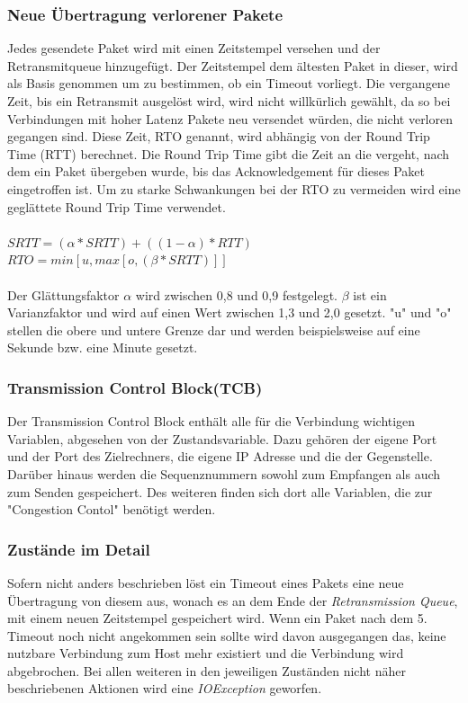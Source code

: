 \subsubsection{Neue Übertragung verlorener Pakete}
Jedes gesendete Paket wird mit einen Zeitstempel versehen und der Retransmitqueue hinzugefügt. Der Zeitstempel dem ältesten Paket in dieser, wird als Basis genommen um zu bestimmen, ob ein Timeout vorliegt. Die vergangene Zeit, bis ein Retransmit ausgelöst wird, wird nicht willkürlich gewählt, da so bei Verbindungen mit hoher Latenz Pakete neu versendet würden, die nicht verloren gegangen sind. Diese Zeit, RTO genannt, wird abhängig von der Round Trip Time (RTT) berechnet. Die Round Trip Time gibt die Zeit an die vergeht, nach dem ein Paket übergeben wurde, bis das Acknowledgement für dieses Paket eingetroffen ist.  Um zu starke Schwankungen bei der RTO zu vermeiden wird eine geglättete Round Trip Time verwendet. \\\\
$SRTT = (\alpha * SRTT) + ((1-\alpha)*RTT)$\\
$RTO = min [u, max [o, (\beta *SRTT)]]$\\\\
Der Glättungsfaktor $\alpha$ wird zwischen 0,8 und 0,9 festgelegt. $\beta$ ist ein Varianzfaktor und wird auf einen Wert zwischen 1,3 und 2,0 gesetzt. "{}u"{} und "{}o"{} stellen die obere und untere Grenze dar und werden beispielsweise auf eine Sekunde bzw. eine Minute gesetzt.


\subsubsection{Transmission Control Block(TCB)}

Der Transmission Control Block enthält alle für die Verbindung wichtigen Variablen, abgesehen von der Zustandsvariable.  Dazu gehören der eigene Port und der Port des Zielrechners, die eigene IP Adresse und die der Gegenstelle. Darüber hinaus werden die Sequenznummern sowohl zum Empfangen als auch zum Senden gespeichert.  Des weiteren finden sich dort alle Variablen, die zur "{}Congestion Contol"{} benötigt werden.  


\subsubsection{Zustände im Detail}
Sofern nicht anders beschrieben löst ein Timeout eines Pakets eine neue Übertragung von diesem aus, wonach es an dem Ende der \textit{Retransmission Queue}, mit einem neuen Zeitstempel gespeichert wird. Wenn ein Paket nach dem 5. Timeout noch nicht angekommen sein sollte wird davon ausgegangen das, keine nutzbare Verbindung zum Host mehr existiert und die Verbindung wird abgebrochen. 
Bei allen weiteren in den jeweiligen Zuständen nicht näher beschriebenen Aktionen wird eine \textit{IOException} geworfen.

